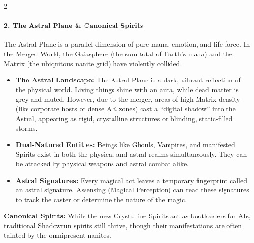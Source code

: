 \documentclass[
  oneside]{article}
\providecommand{\tightlist}{%
  \setlength{\itemsep}{0pt}\setlength{\parskip}{0pt}}
\begin{document}
\begin{multicols}{2}
\hypertarget{the-astral-plane-canonical-spirits}{%
\paragraph{2. The Astral Plane \& Canonical
Spirits}\label{the-astral-plane-canonical-spirits}}

The Astral Plane is a parallel dimension of pure
mana, emotion, and life force. In the Merged
World, the Gaiasphere (the sum total of Earth's
mana) and the Matrix (the ubiquitous nanite grid)
have violently collided.

\begin{itemize}
\tightlist
\item
  \textbf{The Astral Landscape:} The Astral Plane
  is a dark, vibrant reflection of the physical
  world. Living things shine with an aura, while
  dead matter is grey and muted. However, due to
  the merger, areas of high Matrix density (like
  corporate hosts or dense AR zones) cast a
  ``digital shadow'' into the Astral, appearing as
  rigid, crystalline structures or blinding,
  static-filled storms.
\item
  \textbf{Dual-Natured Entities:} Beings like
  Ghouls, Vampires, and manifested Spirits exist
  in both the physical and astral realms
  simultaneously. They can be attacked by physical
  weapons and astral combat alike.
\item
  \textbf{Astral Signatures:} Every magical act
  leaves a temporary fingerprint called an astral
  signature. Assensing (Magical Perception) can
  read these signatures to track the caster or
  determine the nature of the magic.
\end{itemize}

\textbf{Canonical Spirits:} While the new
Crystalline Spirits act as bootloaders for AIs,
traditional Shadowrun spirits still thrive, though
their manifestations are often tainted by the
omnipresent nanites.


\end{multicols}
\end{document}
